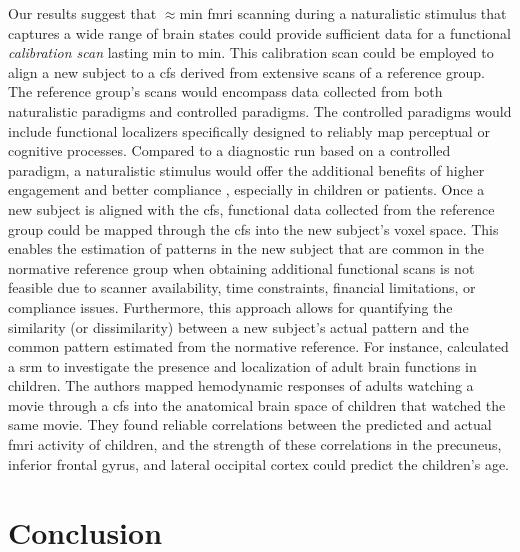 
%
Our results suggest that $\approx$\unit[15]{min} \ac{fmri} scanning during a
naturalistic stimulus that captures a wide range of brain states could provide
sufficient data for a functional \textit{calibration scan} lasting
\unit[15]{min} to \unit[30]{min}.
%
This calibration scan could be employed to align a new subject to a \ac{cfs}
derived from extensive scans of a reference group.
%
The reference group's scans would encompass data collected from both
naturalistic paradigms and controlled paradigms.
%
The controlled paradigms would include functional localizers specifically
designed to reliably map perceptual or cognitive processes.
%
Compared to a diagnostic run based on a controlled paradigm, a naturalistic
stimulus would offer the additional benefits of higher engagement and better
compliance \citep{vanderwal2015inscapes, eickhoff2020towards}, especially in
children or patients.
%
Once a new subject is aligned with the \ac{cfs}, functional data collected from
the reference group could be mapped through the \ac{cfs} into the new subject's
voxel space.
%
This enables the estimation of patterns in the new subject that are common in
the normative reference group when obtaining additional functional scans is not
feasible due to scanner availability, time constraints, financial limitations,
or compliance issues.
%
Furthermore, this approach allows for quantifying the similarity (or
dissimilarity) between a new subject's actual pattern and the common pattern
estimated from the normative reference.
%
For instance, \citet{yates2021emergence} calculated a \ac{srm} to investigate
the presence and localization of adult brain functions in children.
%
The authors mapped hemodynamic responses of adults watching a movie through a
\ac{cfs} into the anatomical brain space of children that watched the same
movie.
%
They found reliable correlations between the predicted and actual \ac{fmri}
activity of children, and the strength of these correlations in the precuneus,
inferior frontal gyrus, and lateral occipital cortex could predict the
children's age.



\section{Conclusion}


